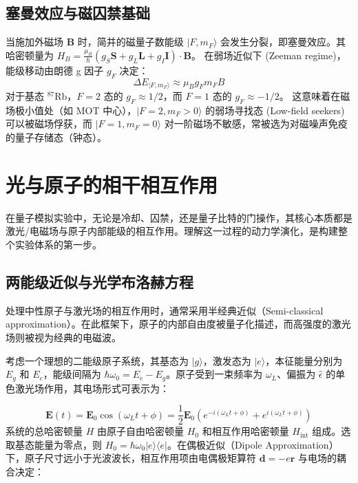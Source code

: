 \documentclass[../main.tex]{subfiles}
\begin{document}
\subsection{塞曼效应与磁囚禁基础}
当施加外磁场 $\mathbf{B}$ 时，简并的磁量子数能级 $|F, m_F\rangle$ 会发生分裂，即塞曼效应。其哈密顿量为 $H_B = \frac{\mu_B}{\hbar}(g_S \mathbf{S} + g_L \mathbf{L} + g_I \mathbf{I})\cdot \mathbf{B}$。
在弱场近似下 (Zeeman regime)，能级移动由朗德 g 因子 $g_F$ 决定：
\begin{equation}
\Delta E_{|F, m_F\rangle} \approx \mu_B g_F m_F B
\end{equation}
对于基态 $^{87}\text{Rb}$，$F=2$ 态的 $g_F \approx 1/2$，而 $F=1$ 态的 $g_F \approx -1/2$。
这意味着在磁场极小值处（如 MOT 中心），$|F=2, m_F>0\rangle$ 的弱场寻找态 (Low-field seekers) 可以被磁场俘获，而 $|F=1, m_F=0\rangle$ 对一阶磁场不敏感，常被选为对磁噪声免疫的量子存储态（钟态）。


\section{光与原子的相干相互作用} 
在量子模拟实验中，无论是冷却、囚禁，还是量子比特的门操作，其核心本质都是激光/电磁场与原子内部能级的相互作用。理解这一过程的动力学演化，是构建整个实验体系的第一步。

\subsection{两能级近似与光学布洛赫方程}
处理中性原子与激光场的相互作用时，通常采用半经典近似（Semi-classical approximation）。在此框架下，原子的内部自由度被量子化描述，而高强度的激光场则被视为经典的电磁波。

考虑一个理想的二能级原子系统，其基态为 $|g\rangle$，激发态为 $|e\rangle$，本征能量分别为 $E_g$ 和 $E_e$，能级间隔为 $\hbar\omega_0 = E_e - E_g$。原子受到一束频率为 $\omega_L$、偏振为 $\hat{\epsilon}$ 的单色激光场作用，其电场形式可表示为：

\begin{equation}
\mathbf{E}(t) = \mathbf{E}_0 \cos(\omega_L t + \phi) = \frac{1}{2} \mathbf{E}_0 (e^{-i(\omega_L t + \phi)} + e^{i(\omega_L t + \phi)})
\end{equation}
系统的总哈密顿量 $H$ 由原子自由哈密顿量 $H_0$ 和相互作用哈密顿量 $H_{\text{int}}$ 组成。选取基态能量为零点，则 $H_0 = \hbar\omega_0 |e\rangle\langle e|$。在偶极近似（Dipole Approximation）下，原子尺寸远小于光波波长，相互作用项由电偶极矩算符 $\mathbf{d} = -e\mathbf{r}$ 与电场的耦合决定：
\end{document}
